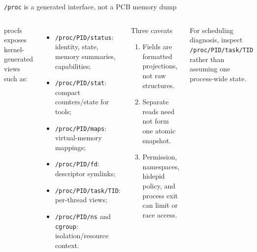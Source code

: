 \documentclass[aspectratio=169,11pt]{beamer}
\newcommand{\code}[1]{\texttt{#1}}
\begin{document}
\begin{frame}{\code{/proc} is a generated interface, not a PCB memory dump}
  \begin{columns}[T,onlytextwidth]
      procfs exposes kernel-generated views such as:
      \begin{itemize}
        \item \code{/proc/PID/status}: identity, state, memory summaries, capabilities;
        \item \code{/proc/PID/stat}: compact counters/state for tools;
        \item \code{/proc/PID/maps}: virtual-memory mappings;
        \item \code{/proc/PID/fd}: descriptor symlinks;
        \item \code{/proc/PID/task/TID}: per-thread views;
        \item \code{/proc/PID/ns} and \code{cgroup}: isolation/resource context.
      \end{itemize}
      \begin{alertblock}{Three caveats}
        \begin{enumerate}
          \item Fields are formatted projections, not raw structures.
          \item Separate reads need not form one atomic snapshot.
          \item Permission, namespaces, hidepid policy, and process exit can limit or race access.
        \end{enumerate}
      \end{alertblock}
      \begin{tcolorbox}[title=Thread inspection]
        For scheduling diagnosis, inspect \code{/proc/PID/task/TID} rather than assuming one process-wide state.
      \end{tcolorbox}
  \end{columns}
\end{frame}
\end{document}
